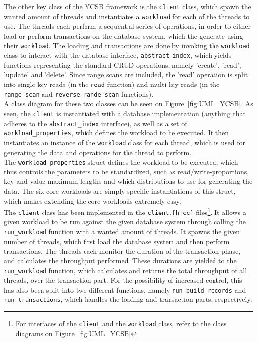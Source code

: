 \documentclass[11pt]{article} %
\begin{document}
The other key class of the YCSB framework is the \verb|client| class, which spawn the wanted amount of threads and instantiates a \verb|workload| for each of the threads to use. The threads each perform a sequential series of operations, in order to either load or perform transactions on the database system, which the generate using their \verb|workload|. The loading and transactions are done by invoking the \verb|workload| class to interact with the database interface, \verb|abstract_index|, which yields functions representing the standard CRUD operations, namely 'create', 'read', 'update' and 'delete'. Since range scans are included, the 'read' operation is split into single-key reads (in the \verb|read| function) and multi-key reads (in the \verb|range_scan| and \verb|reverse_rande_scan| functions). \\

A class diagram for these two classes can be seen on Figure~\ref{fig:UML_YCSB}. As seen, the \verb|client| is instantiated with a database implementation (anything that adheres to the \verb|abstract_index| interface), as well as a set of \verb|workload_properties|, which defines the workload to be executed. It then instantiates an instance of the \verb|workload| class for each thread, which is used for generating the data and operations for the thread to perform. \\

The \verb|workload_properties| struct defines the workload to be executed, which thus controls the parameters to be standardized, such as read/write-proportions, key and value maximum lengths and which distributions to use for generating the data. The six core workloads are simply specific instantiations of this struct, which makes extending the core workloads extremely easy. \\

The \verb|client| class has been implemented in the \verb=client.[h|cc]= files\footnote{For interfaces of the \verb|client| and the \verb|workload| class, refer to the class diagrams on Figure~\ref{fig:UML_YCSB}}. It allows a given workload to be run against the given database system through calling the \verb|run_workload| function with a wanted amount of threads. It spawns the given number of threads, which first load the database system and then perform transactions. The threads each monitor the duration of the transaction-phase, and calculates the throughput performed. These durations are yielded to the \verb|run_workload| function, which calculates and returns the total throughput of all threads, over the transaction part. For the possibility of increased control, this has also been split into two different functions, namely \verb|run_build_records| and \verb|run_transactions|, which handles the loading and transaction parts, respectively. \\
\end{document}
